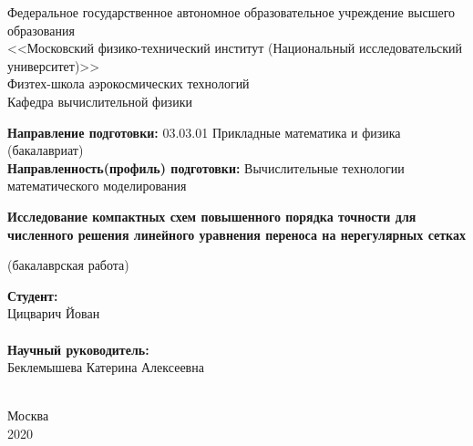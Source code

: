 \documentclass[14pt]{article}
\begin{document}
\begin{center}
\small
Федеральное государственное автономное образовательное учреждение высшего образования\\
<<Московский физико-технический институт (Национальный исследовательский университет)>> \\
Физтех-школа аэрокосмических технологий\\
Кафедра вычислительной физики
\end{center}

\begin{flushleft}
\small
\textbf{Направление подготовки:} 03.03.01 Прикладные математика и физика (бакалавриат)\\
\textbf{Направленность(профиль) подготовки:} Вычислительные технологии математического моделирования\\
\end{flushleft}

\begin{center}
\LARGE
\textbf{Исследование компактных схем повышенного порядка точности для численного решения линейного уравнения переноса на нерегулярных сетках}

\small(бакалаврская работа)
\end{center}


\begin{flushright}

\noindent
\textbf{Студент:} \\
Цицварич Йован\\
\underline{\hspace{3cm}}\\
\textbf{Научный руководитель:}\\
Беклемышева Катерина Алексеевна\\
\underline{\hspace{3cm}}\\

\end{flushright}

\begin{center}
\small
Москва\\
2020
\end{center}

\newpage
\setcounter{page}{2}
\end{document}

